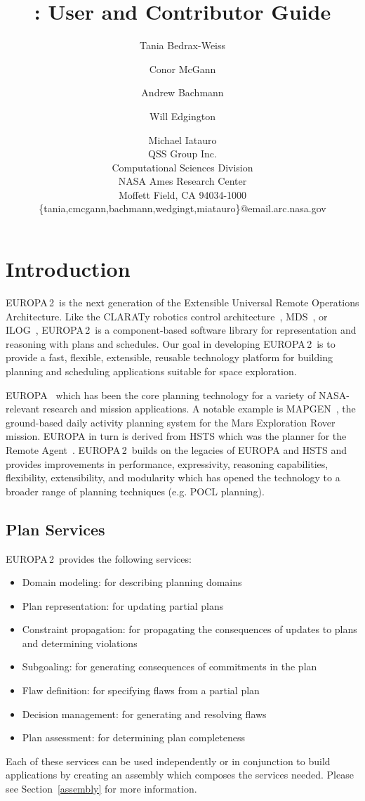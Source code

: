 \documentclass[10pt, letterpaper, twoside]{article}
\author{Tania Bedrax-Weiss \and Conor McGann \and Andrew Bachmann \and Will Edgington \and Michael Iatauro \\
QSS Group Inc. \\
Computational Sciences Division \\
NASA Ames Research Center \\
Moffett Field, CA 94034-1000 \\
\{tania,cmcgann,bachmann,wedgingt,miatauro\}@email.arc.nasa.gov
}
\title{\ET: User and Contributor Guide}
\begin{document}
\newcommand{\ET}{EUROPA\,2}

\maketitle

\tableofcontents

\section{Introduction}
\label{intro}
\ET\, is the next generation of the Extensible Universal Remote
Operations Architecture.  Like the CLARATy robotics control
architecture~\cite{kn:Ne}, MDS~\cite{MDS}, or ILOG~\cite{ILOG}, \ET\, is a 
component-based software library for representation and reasoning with
plans and schedules. Our goal in developing \ET\, is to provide a fast,
flexible, extensible, reusable technology platform for building planning
and scheduling applications suitable for space exploration.

EUROPA~\cite{caip,interplanetary} which has been the core planning technology for a
variety of NASA-relevant research and mission applications. A notable
example is MAPGEN~\cite{mapgen}, the ground-based daily activity planning
system for the Mars Exploration Rover mission. EUROPA in turn is derived
from HSTS which was the planner for the Remote Agent~\cite{rax}. \ET\,
builds on the legacies of EUROPA and HSTS and provides improvements in
performance, expressivity, reasoning capabilities, flexibility,
extensibility, and modularity which has opened the technology to a broader
range of planning techniques (e.g. POCL planning).

\subsection{Plan Services}
\label{services}
\ET\, provides the following services:
\begin{itemize}
\item Domain modeling: for describing planning domains
\item Plan representation: for updating partial plans 
\item Constraint propagation: for propagating the consequences of updates
to plans and determining violations
\item Subgoaling: for generating consequences of commitments in the plan
\item Flaw definition: for specifying flaws from a partial plan
\item Decision management: for generating and resolving flaws
\item Plan assessment: for determining plan completeness
\end{itemize}
Each of these services can be used independently or in conjunction to build
applications by creating an assembly which composes the services
needed. Please see Section~\ref{assembly} for more information.
\end{document}
